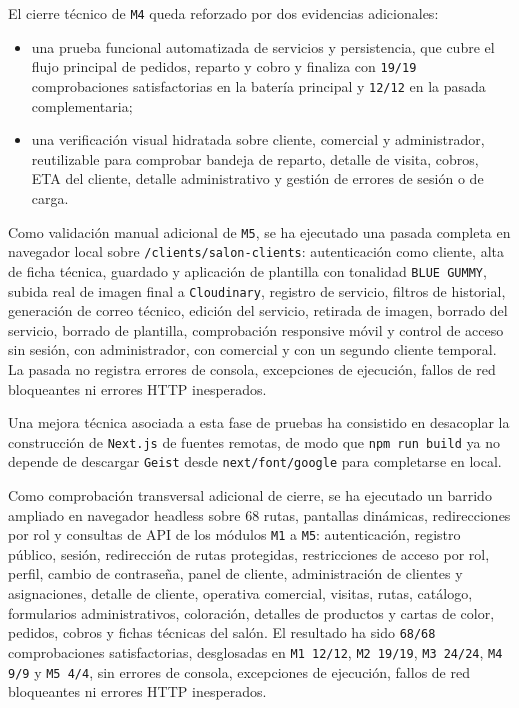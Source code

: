 El cierre técnico de \texttt{M4} queda reforzado por dos evidencias adicionales:

\begin{itemize}
    \item una prueba funcional automatizada de servicios y persistencia, que cubre el flujo principal de pedidos, reparto y cobro y finaliza con \texttt{19/19} comprobaciones satisfactorias en la batería principal y \texttt{12/12} en la pasada complementaria;
    \item una verificación visual hidratada sobre cliente, comercial y administrador, reutilizable para comprobar bandeja de reparto, detalle de visita, cobros, ETA del cliente, detalle administrativo y gestión de errores de sesión o de carga.
\end{itemize}

Como validación manual adicional de \texttt{M5}, se ha ejecutado una pasada completa en navegador local sobre \texttt{/clients/salon-clients}: autenticación como cliente, alta de ficha técnica, guardado y aplicación de plantilla con tonalidad \texttt{BLUE GUMMY}, subida real de imagen final a \texttt{Cloudinary}, registro de servicio, filtros de historial, generación de correo técnico, edición del servicio, retirada de imagen, borrado del servicio, borrado de plantilla, comprobación responsive móvil y control de acceso sin sesión, con administrador, con comercial y con un segundo cliente temporal. La pasada no registra errores de consola, excepciones de ejecución, fallos de red bloqueantes ni errores HTTP inesperados.

Una mejora técnica asociada a esta fase de pruebas ha consistido en desacoplar la construcción de \texttt{Next.js} de fuentes remotas, de modo que \texttt{npm run build} ya no depende de descargar \texttt{Geist} desde \texttt{next/font/google} para completarse en local.

Como comprobación transversal adicional de cierre, se ha ejecutado un barrido ampliado en navegador headless sobre 68 rutas, pantallas dinámicas, redirecciones por rol y consultas de API de los módulos \texttt{M1} a \texttt{M5}: autenticación, registro público, sesión, redirección de rutas protegidas, restricciones de acceso por rol, perfil, cambio de contraseña, panel de cliente, administración de clientes y asignaciones, detalle de cliente, operativa comercial, visitas, rutas, catálogo, formularios administrativos, coloración, detalles de productos y cartas de color, pedidos, cobros y fichas técnicas del salón. El resultado ha sido \texttt{68/68} comprobaciones satisfactorias, desglosadas en \texttt{M1 12/12}, \texttt{M2 19/19}, \texttt{M3 24/24}, \texttt{M4 9/9} y \texttt{M5 4/4}, sin errores de consola, excepciones de ejecución, fallos de red bloqueantes ni errores HTTP inesperados.

